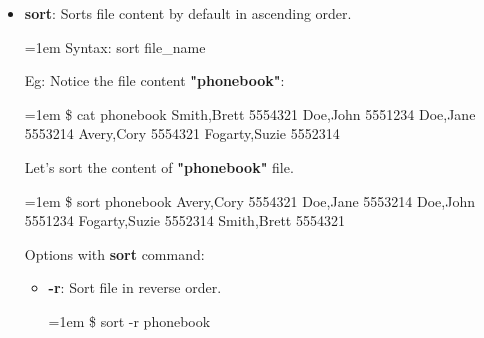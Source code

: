 \begin{flushleft}
\begin{itemize}
		\bigskip
		\bigskip
		\item \textbf{sort}: Sorts file content by default in ascending order.
		\bigskip
		\begin{tcolorbox}[breakable,notitle,boxrule=-0pt,colback=pink,colframe=pink]
			\color{black}
			\font=1em
			Syntax: sort file\_name
			\font=4pt
		\end{tcolorbox}
		Eg: Notice the file content \textbf{"phonebook"}:
		\bigskip
		\begin{tcolorbox}[breakable,notitle,boxrule=-0pt,colback=black,colframe=black]
			\color{green}
			\font=1em
			\$ cat phonebook
			\color{white}
			\newline
			Smith,Brett 5554321
			\newline
			Doe,John 5551234
			\newline
			Doe,Jane 5553214
			\newline
			Avery,Cory 5554321
			\newline
			Fogarty,Suzie 5552314
			\font=4pt
		\end{tcolorbox}		
		Let's sort the content of \textbf{"phonebook"} file.
		\bigskip
		\begin{tcolorbox}[breakable,notitle,boxrule=-0pt,colback=black,colframe=black]
			\color{green}
			\font=1em
			\$ sort phonebook
			\color{white}
			\newline
			Avery,Cory 5554321
			\newline
			\color{white}
			Doe,Jane 5553214
			\newline
			\color{white}
			Doe,John 5551234
			\newline
			Fogarty,Suzie 5552314
			\newline
			Smith,Brett 5554321
			\font=4pt
		\end{tcolorbox}		
		Options with \textbf{sort} command:
		\begin{itemize}
			\item \textbf{-r}: Sort file in reverse order.
			\bigskip
			\begin{tcolorbox}[breakable,notitle,boxrule=-0pt,colback=black,colframe=black]
				\color{green}
				\font=1em
				\$ sort -r phonebook
				\font=4pt
			\end{tcolorbox}		
		\end{itemize}


\end{itemize}
\end{flushleft}
